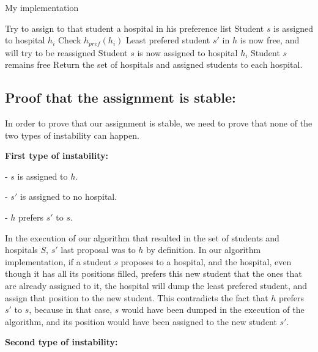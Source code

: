 \documentclass{article}
\begin{document}
\begin{algorithm}
\caption{My implementation}
\begin{algorithmic}[1]
 \State Try to assign to that student a hospital in his preference list
  \State Student $s$ is assigned to hospital $h_i$
   \State Check $h_{pref} (h_i)$
   \State Least prefered student $s'$ in $h$ is now free, and will try to be reassigned
   \State Student $s$ is now assigned to hospital $h_i$
   \State Student $s$ remains free
  \EndIf
 \EndIf
\EndWhile
\State Return the set of hospitals and assigned students to each hospital.  
\end{algorithmic}
\end{algorithm}

\pagebreak

\subsection*{Proof that the assignment is stable:}

In order to prove that our assignment is stable, we need to prove that none of the two types of instability can happen.

\textbf{First type of instability:}

- $s$ is assigned to $h$.

- $s'$ is assigned to no hospital.

- $h$ prefers $s'$ to $s$.

In the execution of our algorithm that resulted in the set of students and hospitals $S$, $s'$ last proposal was to $h$ by definition. In our algorithm implementation, if a student $s$ proposes to a hospital, and the hospital, even though it has all its positions filled, prefers this new student that the ones that are already assigned to it, the hospital will dump the least prefered student, and assign that position to the new student. This contradicts the fact that $h$ prefers $s'$ to $s$, because in that case, $s$ would have been dumped in the execution of the algorithm, and its position would have been assigned to the new student $s'$.

\textbf{Second type of instability:}
\end{document}
